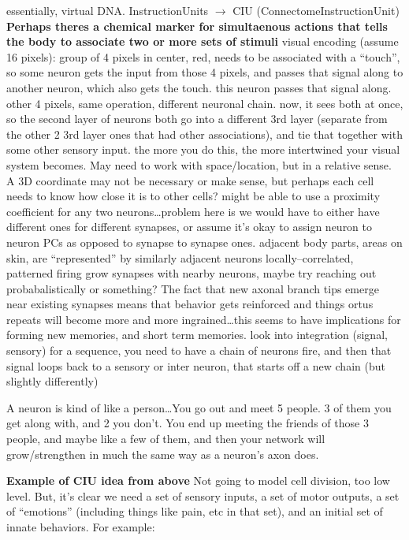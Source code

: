 \documentclass[11pt, a4paper, oneside]{article}   	%
\begin{document}
\begin{outline}
    \subpoint essentially, virtual DNA.
        \subsubpoint InstructionUnits $\rightarrow$ CIU (ConnectomeInstructionUnit)
  \point \textbf{Perhaps theres a chemical marker for simultaenous actions that tells the body to associate two or more sets of stimuli}
  \point visual encoding (assume 16 pixels):
    \subpoint group of 4 pixels in center, red, needs to be associated with a ``touch'', so some neuron gets the input from those 4 pixels, and passes that signal along to another neuron, which also gets the touch. this neuron passes that signal along.
    \subpoint other 4 pixels, same operation, different neuronal chain.
    \subpoint now, it sees both at once, so the second layer of neurons both go into a different 3rd layer (separate from the other 2 3rd layer ones that had other associations), and tie that together with some other sensory input.
    \subpoint the more you do this, the more intertwined your visual system becomes.
\point May need to work with space/location, but in a relative sense. A 3D coordinate may not be necessary or make sense, but perhaps each cell needs to know how close it is to other cells?
    \subpoint might be able to use a proximity coefficient for any two neurons\ldots problem here is we would have to either have different ones for different synapses, or assume it's okay to assign neuron to neuron PCs as opposed to synapse to synapse ones.
    \subpoint adjacent body parts, areas on skin, are ``represented'' by similarly adjacent neurons
\point locally--correlated, patterned firing 
\point grow synapses with nearby neurons, maybe try reaching out probabalistically or something?
\point The fact that new axonal branch tips emerge near existing synapses means that behavior gets reinforced and things ortus repeats will become more and more ingrained\ldots this seems to have implications for forming new memories, and short term memories.
\point look into integration (signal, sensory)
\point for a sequence, you need to have a chain of neurons fire, and then that signal loops back to a sensory or inter neuron, that starts off a new chain (but slightly differently)
\end{outline}

A neuron is kind of like a person\ldots You go out and meet 5 people. 3 of them you get along with, and 2 you don't. You end up meeting the friends of those 3 people, and maybe like a few of them, and then your network will grow/strengthen in much the same way as a neuron's axon does.

\textbf{Example of CIU idea from above}
Not going to model cell division, too low level. But, it's clear we need a set of sensory inputs, a set of motor outputs, a set of ``emotions'' (including things like pain, etc in that set), and an initial set of innate behaviors. For example:
\end{document}
